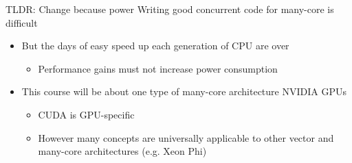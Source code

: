 \documentclass[aspectratio=43]{beamer}
\begin{document}
\begin{frame}[fragile]{TLDR: Change because power}
    Writing good concurrent code for many-core is difficult
    \begin{itemize}
        \item But the days of easy speed up each generation of CPU are over
        \begin{itemize}
            \item Performance gains must not increase power consumption
        \end{itemize}
        \item This course will be about one type of many-core architecture NVIDIA GPUs
        \begin{itemize}
            \item CUDA is GPU-specific
            \item However many concepts are universally applicable to other vector and many-core architectures (e.g. Xeon Phi)
        \end{itemize}
    \end{itemize}
\end{frame}
\end{document}
